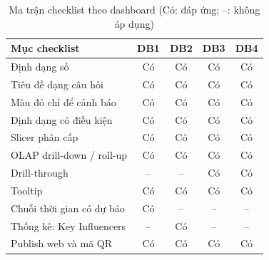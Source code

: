 \begin{table}[htbp]\centering\scriptsize\caption{Ma trận checklist theo dashboard (Có: đáp ứng; --: không áp dụng)}\label{tab:dash-checklist}
\begin{tabular}{p{5.6cm}cccc}\toprule
\textbf{Mục checklist} & \textbf{DB1} & \textbf{DB2} & \textbf{DB3} & \textbf{DB4}\\\midrule
Định dạng số & Có & Có & Có & Có\\
Tiêu đề dạng câu hỏi & Có & Có & Có & Có\\
Màu đỏ chỉ để cảnh báo & Có & Có & Có & Có\\
Định dạng có điều kiện & Có & Có & Có & Có\\
Slicer phân cấp & Có & Có & Có & Có\\
OLAP drill-down / roll-up & Có & Có & Có & Có\\
Drill-through & -- & -- & Có & Có\\
Tooltip & Có & Có & Có & Có\\
Chuỗi thời gian có dự báo & Có & -- & -- & --\\
Thống kê: Key Influencers & -- & Có & -- & --\\
Publish web và mã QR & Có & Có & Có & Có\\
\bottomrule\end{tabular}\end{table}
